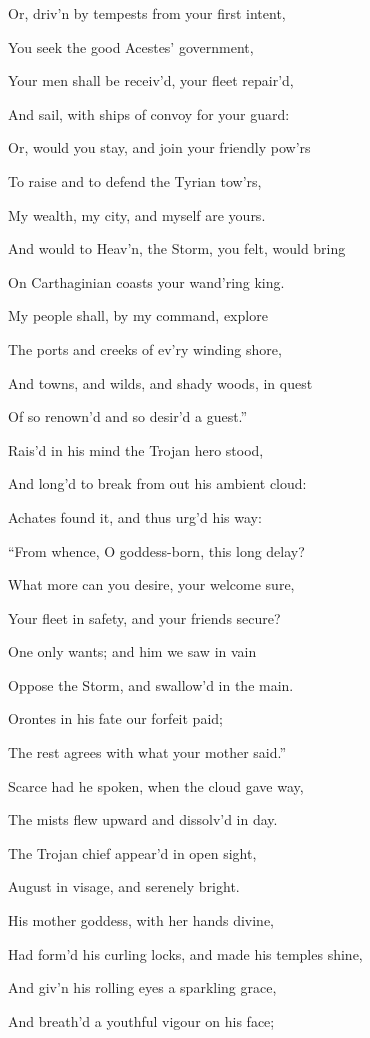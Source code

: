 Or, driv’n by tempests from your first intent,

You seek the good Acestes’ government,

Your men shall be receiv’d, your fleet repair’d,

And sail, with ships of convoy for your guard:

Or, would you stay, and join your friendly pow’rs

To raise and to defend the Tyrian tow’rs,

My wealth, my city, and myself are yours.

And would to Heav’n, the Storm, you felt, would bring

On Carthaginian coasts your wand’ring king.

My people shall, by my command, explore

The ports and creeks of ev’ry winding shore,

And towns, and wilds, and shady woods, in quest

Of so renown’d and so desir’d a guest.”

Rais’d in his mind the Trojan hero stood,

And long’d to break from out his ambient cloud:

Achates found it, and thus urg’d his way:

“From whence, O goddess-born, this long delay?

What more can you desire, your welcome sure,

Your fleet in safety, and your friends secure?

One only wants; and him we saw in vain

Oppose the Storm, and swallow’d in the main.

Orontes in his fate our forfeit paid;

The rest agrees with what your mother said.”

Scarce had he spoken, when the cloud gave way,

The mists flew upward and dissolv’d in day.

The Trojan chief appear’d in open sight,

August in visage, and serenely bright.

His mother goddess, with her hands divine,

Had form’d his curling locks, and made his temples shine,

And giv’n his rolling eyes a sparkling grace,

And breath’d a youthful vigour on his face;

